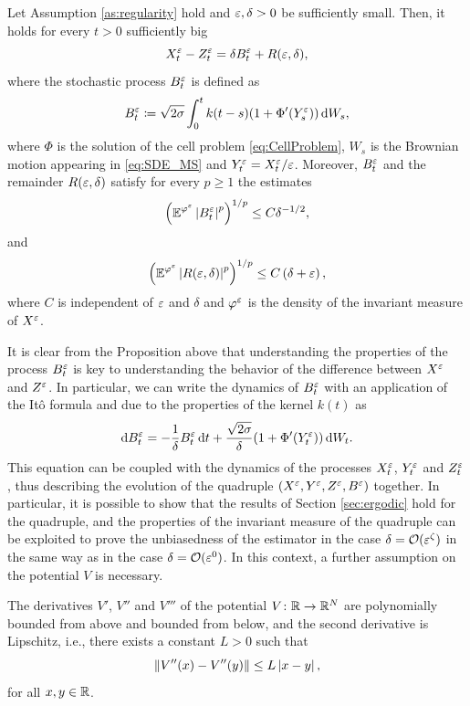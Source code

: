\documentclass[10pt]{article}
\begin{document}
\begin{proposition} \label{prop:zeta} Let Assumption \ref{as:regularity} hold and $\varepsilon,\delta>0$ be sufficiently small. Then, it holds for every $t > 0$ sufficiently big 
	\begin{equation}
	X_t^\varepsilon - Z_t^\varepsilon = \delta B^\varepsilon_t + R(\varepsilon,\delta),
	\end{equation}
	where the stochastic process $B_t^\varepsilon$ is defined as
	\begin{equation}\label{eq:defBeta}
	B_t^\varepsilon \coloneqq \sqrt{2\sigma} \int_0^t k(t-s)(1 + \Phi'(Y_s^\varepsilon)) \,\mathrm{d} W_s,
	\end{equation}
	where $\Phi$ is the solution of the cell problem \eqref{eq:CellProblem}, $W_s$ is the Brownian motion appearing in \eqref{eq:SDE_MS} and $Y_t^\varepsilon = X_t^\varepsilon / \varepsilon$. Moreover, $B_t^\varepsilon$ and the remainder $R(\varepsilon,\delta)$ satisfy for every $p \geq 1$ the estimates
	\begin{equation} \label{eq:estimate_beta}
	\left( \operatorname{\mathbb{E}}^{\varphi^\varepsilon} \left\lvert B_t^\varepsilon\right\rvert^p \right)^{1/p} \leq C \delta^{-1/2},
	\end{equation}
	and
	\begin{equation} \label{eq:remainder_zeta}
	\left( \operatorname{\mathbb{E}}^{\varphi^\varepsilon} \left| R(\varepsilon,\delta) \right|^p \right)^{1/p} \le C \left( \delta + \varepsilon \right),
	\end{equation}
	where $C$ is independent of $\varepsilon$ and $\delta$ and $\varphi^\varepsilon$ is the density of the invariant measure of $X^\varepsilon$.
\end{proposition}

It is clear from the Proposition above that understanding the properties of the process $B_t^\varepsilon$ is key to understanding the behavior of the difference between $X^\varepsilon$ and $Z^\varepsilon$. In particular, we can write the dynamics of $B_t^\varepsilon$ with an application of the Itô formula and due to the properties of the kernel $k(t)$ as
\begin{equation}
	\mathrm{d} B_t^\varepsilon = - \frac1\delta B_t^\varepsilon \,\mathrm{d} t + \frac{\sqrt{2\sigma}}{\delta}(1+\Phi'(Y_t^\varepsilon)) \,\mathrm{d} W_t.
\end{equation}
This equation can be coupled with the dynamics of the processes $X_t^\varepsilon$, $Y_t^\varepsilon$ and $Z_t^\varepsilon$, thus describing the evolution of the quadruple $(X^\varepsilon, Y^\varepsilon, Z^\varepsilon, B^\varepsilon)$ together. In particular, it is possible to show that the results of Section \ref{sec:ergodic} hold for the quadruple, and the properties of the invariant measure of the quadruple can be exploited to prove the unbiasedness of the estimator in the case $\delta = \mathcal O(\varepsilon^\zeta)$ in the same way as in the case $\delta = \mathcal O(\varepsilon^0)$. In this context, a further assumption on the potential $V$ is necessary.
\begin{assumption}\label{as:regularityZeta} The derivatives $V'$, $V''$ and $V'''$ of the potential $V \colon \mathbb{R} \to \mathbb{R}^N$ are polynomially bounded from above and bounded from below, and the second derivative is Lipschitz, i.e., there exists a constant $L > 0$ such that
	\begin{equation}
		\left\|V''(x)-V''(y)\right\| \leq L \left\lvert x - y\right\rvert,
	\end{equation}
	for all $x, y \in \mathbb{R}$.
\end{assumption}
\end{document}

